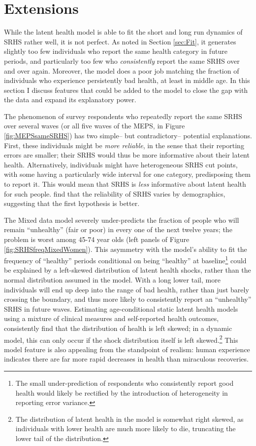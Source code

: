 \documentclass[12pt,pdftex,letterpaper]{article}
\begin{document}
\section{Extensions}\label{sec:Extensions}

While the latent health model is able to fit the short and long run dynamics of SRHS rather well, it is not perfect.  As noted in Section \ref{sec:Fit}, it generates slightly too few individuals who report the same health category in future periods, and particularly too few who \textit{consistently} report the same SRHS over and over again.  Moreover, the model does a poor job matching the fraction of individuals who experience persistently bad health, at least in middle age.  In this section I discuss features that could be added to the model to close the gap with the data and expand its explanatory power.

The phenomenon of survey respondents who repeatedly report the same SRHS over several waves (or all five waves of the MEPS, in Figure \ref{fig:MEPSsameSRHS}) has two simple-- but contradictory-- potential explanations.  First, these individuals might be \textit{more reliable}, in the sense that their reporting errors are smaller; their SRHS would thus be more informative about their latent health.  Alternatively, individuals might have heterogeneous SRHS cut points, with some having a particularly wide interval for one category, predisposing them to report it.  This would mean that SRHS is \textit{less} informative about latent health for such people.  \cite{Crossley02} find that the reliability of SRHS varies by demographics, suggesting that the first hypothesis is better.

The Mixed data model severely under-predicts the fraction of people who will remain ``unhealthy'' (fair or poor) in every one of the next twelve years; the problem is worst among 45-74 year olds (left panels of Figure \ref{fig:SRHSfreqMixedWomen}).  This asymmetry with the model's ability to fit the frequency of ``healthy'' periods conditional on being ``healthy'' at baseline\footnote{The small under-prediction of respondents who consistently report good health would likely be rectified by the introduction of heterogeneity in reporting error variance.} could be explained by a left-skewed distribution of latent health shocks, rather than the normal distribution assumed in the model.  With a long lower tail, more individuals will end up deep into the range of bad health, rather than just barely crossing the boundary, and thus more likely to consistently report an ``unhealthy'' SRHS in future waves.  Estimating age-conditional static latent health models using a mixture of clinical measures and self-reported health outcomes, \cite{Lange12} consistently find that the distribution of health is left skewed; in a dynamic model, this can only occur if the shock distribution itself is left skewed.\footnote{The distribution of latent health in the model is somewhat right skewed, as individuals with lower health are much more likely to die, truncating the lower tail of the distribution.}  This model feature is also appealing from the standpoint of realism: human experience indicates there are far more rapid decreases in health than miraculous recoveries.
\end{document}
